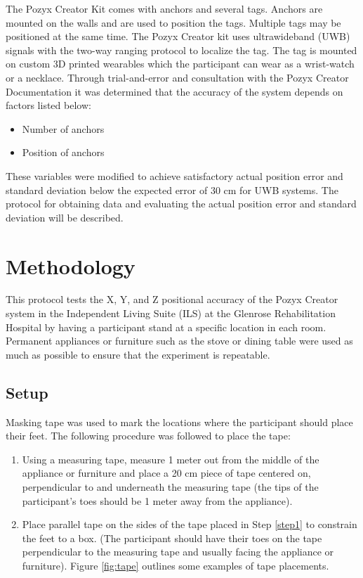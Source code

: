 The Pozyx Creator Kit comes with anchors and several tags. Anchors are mounted 
on the walls and are used to position the tags. Multiple tags may be positioned
at the same time.
The Pozyx Creator kit uses ultrawideband (UWB) signals with the two-way ranging protocol to localize the tag. 
The tag is mounted on custom 3D printed wearables which the participant can wear as 
a wrist-watch or a necklace. Through trial-and-error and consultation with the Pozyx Creator Documentation
\cite{noauthor_hardware_nodate,noauthor_configuration_nodate}
it was determined that the accuracy of the system depends on factors listed below:

\begin{itemize}
    \item Number of anchors
    \item Position of anchors
\end{itemize}

These variables were modified to achieve satisfactory actual position error
and standard deviation below the expected error of 30 cm for UWB systems. The 
protocol for obtaining data and evaluating the actual position error and 
standard deviation will be described.

\section{Methodology}
This protocol tests the X, Y, and Z positional accuracy of the Pozyx Creator system in the Independent
Living Suite (ILS) at the Glenrose Rehabilitation Hospital by having a participant stand at 
a specific location in each room. Permanent appliances or furniture such as the stove
or dining table were used as much as possible to ensure that the experiment is repeatable.

\subsection{Setup}
Masking tape was used to mark the locations where the participant should place their feet.
The following procedure was followed to place the tape:
\begin{enumerate}
    \item Using a measuring tape, measure 1 meter out from the middle of the 
    appliance or furniture and place a 20 cm piece of tape centered on, perpendicular to
    and underneath the measuring tape (the tips of the participant's toes should be 1 meter
    away from the appliance).\label{step1}
    \item Place parallel tape on the sides of the tape placed in Step \ref{step1} to constrain
    the feet to a box. (The participant should have their toes on the tape perpendicular to the
    measuring tape and usually facing the appliance or furniture).
    Figure \ref{fig:tape} outlines some examples of tape placements.
\end{enumerate}


